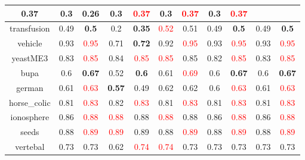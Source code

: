 \documentclass{article}%
\begin{document}
\begin{tabular}{c|cccccccccc}
{0.37
}&\textbf{0.3}&0.26&0.3&\textcolor{red}{ 
0.37
}&0.3&\textcolor{red}{ 
0.37
}&0.3&\textcolor{red}{ 
0.37
}\\%
\hline%
transfusion&0.49&\textbf{0.5}&0.2&\textbf{0.35}&\textcolor{red}{ 
0.52
}&0.51&0.49&\textbf{0.5}&0.49&\textbf{0.5}\\%
\hline%
vehicle&0.93&\textcolor{red}{ 
0.95
}&0.71&\textbf{0.72}&0.92&\textcolor{red}{ 
0.95
}&0.93&\textcolor{red}{ 
0.95
}&0.93&\textcolor{red}{ 
0.95
}\\%
\hline%
yeastME3&0.83&\textcolor{red}{ 
0.85
}&0.84&\textcolor{red}{ 
0.85
}&\textcolor{red}{ 
0.85
}&0.85&0.82&\textcolor{red}{ 
0.85
}&0.83&\textcolor{red}{ 
0.85
}\\%
\hline%
bupa&0.6&\textbf{0.67}&0.52&\textbf{0.6}&0.61&\textcolor{red}{ 
0.69
}&0.6&\textbf{0.67}&0.6&\textbf{0.67}\\%
\hline%
german&0.61&\textcolor{red}{ 
0.63
}&\textbf{0.57}&0.49&0.62&0.62&0.6&\textcolor{red}{ 
0.63
}&0.61&\textcolor{red}{ 
0.63
}\\%
\hline%
horse\_colic&0.81&\textcolor{red}{ 
0.83
}&0.82&\textcolor{red}{ 
0.83
}&0.81&\textcolor{red}{ 
0.83
}&0.81&\textcolor{red}{ 
0.83
}&0.81&\textcolor{red}{ 
0.83
}\\%
\hline%
ionosphere&0.86&\textcolor{red}{ 
0.88
}&\textcolor{red}{ 
0.88
}&0.88&\textcolor{red}{ 
0.88
}&0.88&0.86&\textcolor{red}{ 
0.88
}&0.86&\textcolor{red}{ 
0.88
}\\%
\hline%
seeds&0.88&\textcolor{red}{ 
0.89
}&\textcolor{red}{ 
0.89
}&0.89&0.88&\textcolor{red}{ 
0.89
}&0.88&\textcolor{red}{ 
0.89
}&0.88&\textcolor{red}{ 
0.89
}\\%
\hline%
vertebal&0.73&0.73&0.62&\textcolor{red}{ 
0.74
}&\textcolor{red}{ 
0.74
}&0.73&0.73&0.73&0.73&0.73\\%
\hline%
\end{tabular}

%
\end{document}
